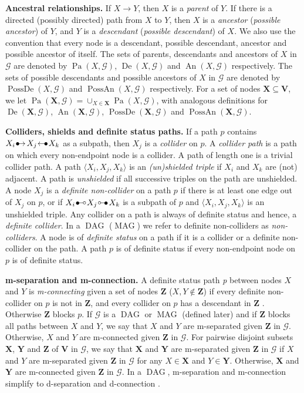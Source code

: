 \documentclass[11pt,a4paper]{article}
\DeclareMathOperator{\DAG}{DAG}
\DeclareMathOperator{\MAG}{MAG}
\DeclareMathOperator{\PossDe}{PossDe}
\DeclareMathOperator{\De}{De}
\DeclareMathOperator{\An}{An}
\DeclareMathOperator{\PossAn}{PossAn}
\DeclareMathOperator{\Pa}{Pa}
\newcommand{\vars}[1][V]{\mathbf{#1}}
\newcommand{\g}[1][G]{\mathcal{#1}}
\newcommand{\bulletcirc}{
  \setlength{\unitlength}{1mm}
  \begin{picture}(5,1)(0,0)
    \put(0.2,0){$\bullet$}
    \put(1.1, 1){\line(1,0){2.4}}
    \put(4, 1){\circle{1}}
  \end{picture}
}
\newcommand{\circbullet}{
  \setlength{\unitlength}{1mm}
  \begin{picture}(5,1)(0,0)
    \put(1,1){\circle{1}}
    \put(1.5,1){\line(1,0){2.4}}
    \put(2.9,0){$\bullet$}
  \end{picture}
}
\newcommand{\bulletarrow}{
  \setlength{\unitlength}{1mm}
  \begin{picture}(5,1)(0,0)
    \put(0.2,0){$\bullet$}
    \put(1,0){$\rightarrow$}
  \end{picture}
}
\newcommand{\arrowbullet}{
  \setlength{\unitlength}{1mm}
  \begin{picture}(5,1)(0,0)
    \put(0.2,0){$\leftarrow$}
    \put(3,0){$\bullet$}
  \end{picture}
}
\begin{document}
\textbf{Ancestral relationships.} If $X\to Y$, then $X$ is a \textit{parent} of $Y$. If there is a directed (possibly directed) path from $X$ to $Y$, then $X$ is a \textit{ancestor} (\textit{possible ancestor}) of $Y$, and $Y$ is a \textit{descendant} (\textit{possible descendant}) of $X$. We also use the convention that every node is a descendant, possible descendant, ancestor and possible ancestor of itself. The sets of parents, descendants and ancestors of $X$ in~$\g$ are denoted by $\Pa(X,\g)$, $\De(X,\g)$ and $\An(X,\g)$ respectively. The sets of possible descendants and possible ancestors of $X$ in $\g$ are denoted by $\PossDe(X,\g)$ and $\PossAn(X,\g)$ respectively. For a set of nodes $\mathbf{X} \subseteq \mathbf{V}$, we let $\Pa(\mathbf{X},\g) = \cup_{X \in \mathbf{X}} \Pa(X,\g)$, with analogous definitions for $\De(\mathbf{X},\g)$, $\An(\mathbf{X},\g)$, $\PossDe(\mathbf{X},\g)$ and $\PossAn(\mathbf{X},\g)$.

\textbf{Colliders, shields and definite status paths.} If a path $p$ contains $X_i \bulletarrow X_j \arrowbullet X_k$ as a subpath, then $X_j$ is a \textit{collider} on $p$. A \textit{collider path} is a path on which every non-endpoint node is a collider. A  path of length one is a trivial collider path. A path $\langle X_{i},X_{j},X_{k} \rangle$ is an \emph{(un)shielded triple} if $ X_{i} $ and $ X_{k}$ are (not) adjacent. A path is \textit{unshielded} if all successive triples on the path are unshielded. A node $X_{j}$ is a \textit{definite non-collider} \citep{zhang2008causal} on a path $p$ if there is at least one edge out of $X_{j}$ on $p$, or if $X_{i} \bulletcirc X_j \circbullet X_k$ is a subpath of $p$ and $\langle X_i,X_j,X_k\rangle$ is an unshielded triple. Any collider on a path is always of definite status and hence, a \textit{definite collider}. In a $\DAG$ ($\MAG$) we refer to definite non-colliders as \emph{non-colliders}. A node is of \textit{definite status} on a path if it is a collider or a definite non-collider on the path. A path $p$ is of definite status if every non-endpoint node on $p$ is of definite status.

\textbf{m-separation and m-connection.} A definite status path \textit{p} between nodes $X$ and $Y$ is \textit{m-connecting} given a set of nodes $\mathbf{Z}$ ($X,Y \notin \mathbf{Z}$) if every definite non-collider on $p$ is not in $\mathbf{Z}$, and every collider on $p$ has a descendant in $\mathbf{Z}$ \citep{richardson2003markov}. Otherwise $\mathbf{Z}$ blocks $p$. If $\g$ is a $\DAG$ or $\MAG$ (defined later) and if $\mathbf{Z}$ blocks all paths between $X$ and $Y$, we say that $X$ and $Y$ are m-separated given $\mathbf{Z}$ in $\g$. Otherwise, $X$ and $Y$ are m-connected given $\mathbf{Z}$ in $\g$. For pairwise disjoint subsets $\mathbf{X}$, $\mathbf{Y}$ and $\mathbf{Z}$ of $\vars$ in $\g$, we say that $\mathbf{X}$ and $\mathbf{Y}$ are m-separated given $\mathbf{Z}$ in $\g$ if $X$ and $Y$ are m-separated given $\mathbf{Z}$ in $\g$ for any $X \in \mathbf{X}$ and $Y\in \mathbf{Y}$. Otherwise, $\mathbf{X}$ and $\mathbf{Y}$ are m-connected given $\mathbf{Z}$ in $\g$. In a $\DAG$, m-separation and m-connection simplify to d-separation and d-connection \citep[][]{Pearl2009}.
\end{document}
